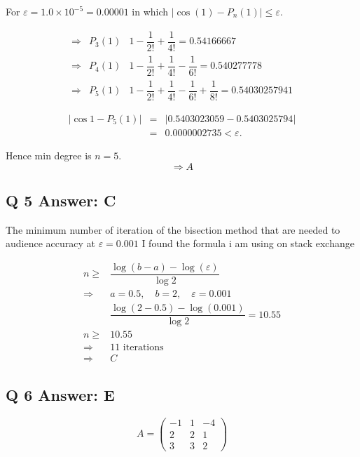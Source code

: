 \documentclass[a4paper,11pt]{article}
\begin{document}
For $\varepsilon = 1.0 \times 10^{-5} = 0.00001$ in which $|\cos(1) - P_n(1)| \leq \varepsilon.$

\[\begin{array}{cll}
    \Rightarrow & P_3(1) & 1 - \dfrac{1}{2!} + \dfrac{1}{4!} = 0.54166667  \\ [4mm]
    \Rightarrow & P_4(1) & 1 - \dfrac{1}{2!} + \dfrac{1}{4!} - \dfrac{1}{6!} = 0.540277778 \\ [4mm]
    \Rightarrow & P_5(1) & 1 - \dfrac{1}{2!} + \dfrac{1}{4!} - \dfrac{1}{6!} + \dfrac{1}{8!} = 0.54030257941
\end{array}\]

\[\begin{array}{cll}
     |\cos 1 - P_5(1)| &=& |0.5403023059 - 0.5403025794| \\
     &=& 0.0000002735 < \varepsilon.
\end{array}\]

Hence min degree is $n = 5$.
\[\Rightarrow \boxed{A}\]

\subsection*{Q 5 Answer: C}

The minimum number of iteration of the bisection method that are needed to audience accuracy at $\varepsilon = 0.001$
I found the formula i am using on stack exchange

\[\begin{array}{rl}
    n \geq&  \dfrac{\log (b-a) - \log(\varepsilon)}{\log 2} \\ [3mm]
    \Rightarrow & a=  0.5, \quad b = 2, \quad \varepsilon = 0.001 \\ [3mm]
    &  \dfrac{\log (2-0.5) - \log(0.001)}{\log 2} = 10.55 \\  [3mm]
    n  \geq &  10.55 \\ [3mm]
     \Rightarrow & \text{11 iterations} \\ [3mm]
     \Rightarrow & \boxed{C}
\end{array}\]

\subsection*{Q 6 Answer: E}

\[A = \left(\begin{matrix} -1 & 1 & -4 \\ 2 & 2 & 1 \\ 3 & 3 & 2  \end{matrix}\right)\]
\end{document}
